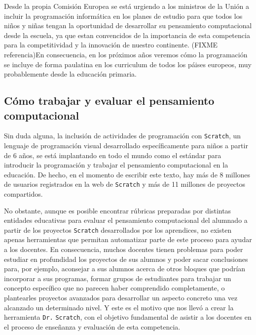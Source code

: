 \documentclass[a4paper,10pt]{article}
\begin{document}
Desde la propia Comisión Europea se está urgiendo a los ministros de la Unión a incluir la programación informática en los planes de estudio para que todos los niños y niñas tengan la oportunidad de desarrollar su pensamiento computacional desde la escuela, ya que estan convencidos de la importancia de esta competencia para la competitividad y la innovación de nuestro continente. (FIXME referencia)En consecuencia, en los próximos años veremos cómo la programación se incluye de forma paulatina en los curriculum de todos los páises europeos, muy probablemente desde la educación primaria.

\subsection*{Cómo trabajar y evaluar el pensamiento computacional}
Sin duda alguna, la inclusión de actividades de programación con \texttt{Scratch}, un lenguaje de programación visual desarrollado específicamente para niños a partir de 6 años, se está implantando en todo el mundo como el estándar para introducir la programación y trabajar el pensamiento computacional en la educación. De hecho, en el momento de escribir este texto, hay más de 8 millones de usuarios registrados en la web de \texttt{Scratch} y más de 11 millones de proyectos compartidos.

No obstante, aunque es posible encontrar rúbricas preparadas por distintas entidades educativas para evaluar el pensamiento computacional del alumnado a partir de los proyectos \texttt{Scratch} desarrollados por los aprendices, no existen apenas herramientas que permitan automatizar parte de este proceso para ayudar a los docentes. En consecuencia, muchos docentes tienen problemas para poder estudiar en profundidad los proyectos de sus alumnos y poder sacar conclusiones para, por ejemplo, aconsejar a sus alumnos acerca de otros bloques que podrían incorporar a sus programas, formar grupos de estudiantes para trabajar un concepto específico que no parecen haber comprendido completamente, o plantearles proyectos avanzados para desarrollar un aspecto concreto una vez alcanzado un determinado nivel. Y este es el motivo que nos llevó a crear la herramienta \texttt{Dr.}{\tiny{ }}\texttt{Scratch}, con el objetivo fundamental de asistir a los docentes en el proceso de enseñanza y evaluación de esta competencia.
\end{document}
